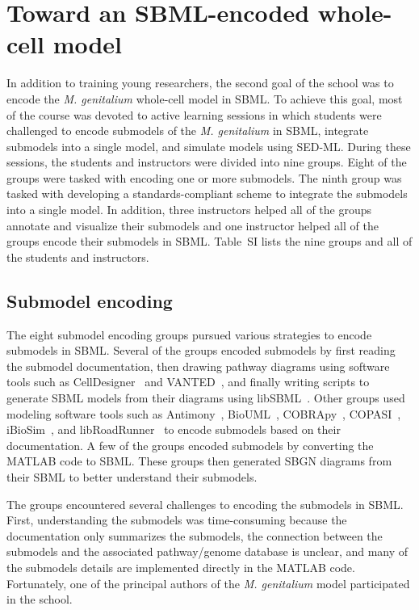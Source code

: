 \documentclass[journal,transmag]{IEEEtran}
\begin{document}
\section{Toward an SBML-encoded whole-cell model}
In addition to training young researchers, the second goal of the school was to encode the \textit{M. genitalium} whole-cell model in SBML. To achieve this goal, most of the course was devoted to active learning sessions in which students were challenged to encode submodels of the \textit{M. genitalium} in SBML, integrate submodels into a single model, and simulate models using SED-ML. During these sessions, the students and instructors were divided into nine groups. Eight of the groups were tasked with encoding one or more submodels. The ninth group was tasked with developing a standards-compliant scheme to integrate the submodels into a single model. In addition, three instructors helped all of the groups annotate and visualize their submodels and one instructor helped all of the groups encode their submodels in SBML. Table~SI lists the nine groups and all of the students and instructors. 

\subsection{Submodel encoding}
The eight submodel encoding groups pursued various strategies to encode submodels in SBML. Several of the groups encoded submodels by first reading the submodel documentation, then drawing pathway diagrams using software tools such as CellDesigner~\cite{funahashi2008celldesigner} and VANTED~\cite{Rohn2012}, and finally writing scripts to generate SBML models from their diagrams using libSBML~\cite{bornstein_2008}. Other groups used modeling software tools such as Antimony~\cite{Smith2009}, BioUML~\cite{Kolpakov2006}, COBRApy~\cite{ebrahim2013cobrapy}, COPASI~\cite{Mendes2009}, iBioSim~\cite{Madsen2012}, and libRoadRunner~\cite{Somogyi17062015} to encode submodels based on their documentation. A few of the groups encoded submodels by converting the MATLAB code to SBML. These groups then generated SBGN diagrams from their SBML to better understand their submodels.

The groups encountered several challenges to encoding the submodels in SBML. First, understanding the submodels was time-consuming because the documentation only summarizes the submodels, the connection between the submodels and the associated pathway/genome database is unclear, and many of the submodels details are implemented directly in the MATLAB code. Fortunately, one of the principal authors of the \textit{M. genitalium} model participated in the school.
\end{document}
